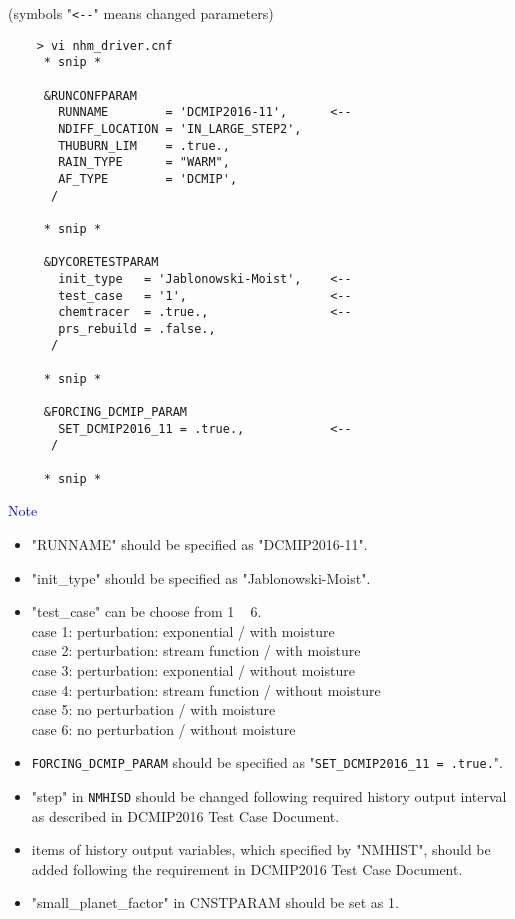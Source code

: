 \documentclass[a4paper]{article}
\begin{document}
 \vspace{0.5cm}

 (symbols "\verb|<--|" means changed parameters)
 \begin{verbatim}
    > vi nhm_driver.cnf
     * snip *

     &RUNCONFPARAM
       RUNNAME        = 'DCMIP2016-11',      <--
       NDIFF_LOCATION = 'IN_LARGE_STEP2',
       THUBURN_LIM    = .true.,
       RAIN_TYPE      = "WARM",
       AF_TYPE        = 'DCMIP',
      /

     * snip *

     &DYCORETESTPARAM
       init_type   = 'Jablonowski-Moist',    <--
       test_case   = '1',                    <--
       chemtracer  = .true.,                 <--
       prs_rebuild = .false.,
      /

     * snip *

     &FORCING_DCMIP_PARAM
       SET_DCMIP2016_11 = .true.,            <--
      /

     * snip *
 \end{verbatim}


 \noindent \textcolor{blue}{{\sf Note}}
 \begin{itemize}
   \item "RUNNAME" should be specified as "DCMIP2016-11".
   \item "init\_type" should be specified as "Jablonowski-Moist".
   \item "test\_case" can be choose from 1 ~ 6.\\
          case 1: perturbation: exponential / with moisture \\
          case 2: perturbation: stream function / with moisture \\
          case 3: perturbation: exponential / without moisture \\
          case 4: perturbation: stream function / without moisture \\
          case 5: no perturbation / with moisture \\
          case 6: no perturbation / without moisture
   \item \verb|FORCING_DCMIP_PARAM| should be specified as "\verb|SET_DCMIP2016_11 = .true.|".
   \item "step" in \verb|NMHISD| should be changed following required history output interval
           as described in DCMIP2016 Test Case Document.
   \item items of history output variables, which specified by "NMHIST", should be added
         following the requirement in DCMIP2016 Test Case Document.
   \item "small\_planet\_factor" in CNSTPARAM should be set as 1.
 \end{itemize}
\end{document}
